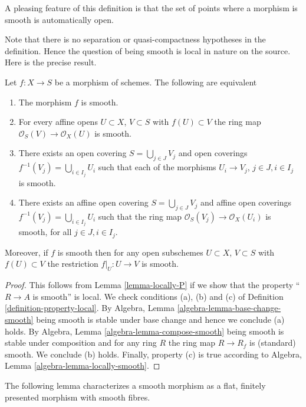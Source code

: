 \noindent
A pleasing feature of this definition is that the set of points
where a morphism is smooth is automatically open.

\medskip\noindent
Note that there is no separation or quasi-compactness hypotheses in the
definition. Hence the question of being smooth is local in nature on
the source. Here is the precise result.

\begin{lemma}
\label{lemma-smooth-characterize}
Let $f : X \to S$ be a morphism of schemes.
The following are equivalent
\begin{enumerate}
\item The morphism $f$ is smooth.
\item For every affine opens $U \subset X$, $V \subset S$
with $f(U) \subset V$ the ring map
$\mathcal{O}_S(V) \to \mathcal{O}_X(U)$ is smooth.
\item There exists an open covering $S = \bigcup_{j \in J} V_j$
and open coverings $f^{-1}(V_j) = \bigcup_{i \in I_j} U_i$ such
that each of the morphisms $U_i \to V_j$, $j\in J, i\in I_j$
is smooth.
\item There exists an affine open covering $S = \bigcup_{j \in J} V_j$
and affine open coverings $f^{-1}(V_j) = \bigcup_{i \in I_j} U_i$ such
that the ring map $\mathcal{O}_S(V_j) \to \mathcal{O}_X(U_i)$ is
smooth, for all $j\in J, i\in I_j$.
\end{enumerate}
Moreover, if $f$ is smooth then for
any open subschemes $U \subset X$, $V \subset S$ with $f(U) \subset V$
the restriction $f|_U : U \to V$ is smooth.
\end{lemma}

\begin{proof}
This follows from Lemma \ref{lemma-locally-P} if we show that
the property ``$R \to A$ is smooth'' is local.
We check conditions (a), (b) and (c) of Definition
\ref{definition-property-local}.
By Algebra, Lemma \ref{algebra-lemma-base-change-smooth}
being smooth is stable under base change and hence
we conclude (a) holds. By
Algebra, Lemma \ref{algebra-lemma-compose-smooth}
being smooth is stable under composition and for any ring
$R$ the ring map $R \to R_f$ is (standard) smooth.
We conclude (b) holds. Finally, property (c) is true
according to Algebra, Lemma \ref{algebra-lemma-locally-smooth}.
\end{proof}


\noindent
The following lemma characterizes a smooth morphism as a
flat, finitely presented morphism with smooth fibres.

